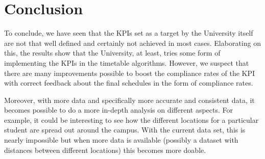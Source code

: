 \section{Conclusion}
To conclude, we have seen that the KPIs set as a target by the University itself are not that well defined and certainly not achieved in most cases. Elaborating on this, the results show that the University, at least, tries some form of implementing the KPIs in the timetable algorithms. However, we suspect that there are many improvements possible to boost the compliance rates of the KPI with correct feedback about the final schedules in the form of compliance rates.

Moreover, with more data and specifically more accurate and consistent data, it becomes possible to do a more in-depth analysis on different aspects. For example, it could be interesting to see how the different locations for a particular student are spread out around the campus. With the current data set, this is nearly impossible but when more data is available (possibly a dataset with distances between different locations) this becomes more doable.